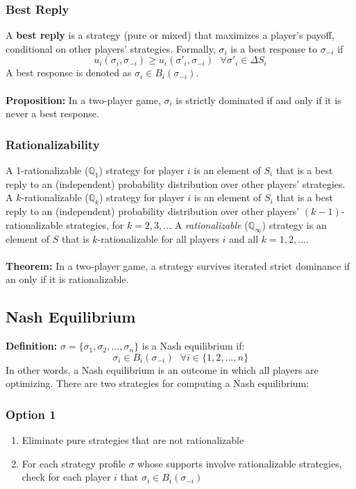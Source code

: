 \documentclass{article}
\newcommand{\Q}{\mathbb{Q}}
\begin{document}
\subsubsection{Best Reply}
A \textbf{best reply} is a strategy (pure or mixed) that maximizes a player's payoff, conditional on other players' strategies. Formally, $\sigma_i$ is a best response to $\sigma_{-i}$ if 
\[
	u_i(\sigma_i,\sigma_{-i})\geq u_i(\sigma'_i,\sigma_{-i})\text{ }\forall \sigma'_i\in\Delta S_i
\]
A best response is denoted as ${\sigma_i\in B_i(\sigma_{-i})}$. \\
\\
\textbf{Proposition:} In a two-player game, $\sigma_i$ is strictly dominated if and only if it is never a best response.

\subsubsection{Rationalizability}
A 1-rationalizable ($\Q_1$) strategy for player $i$ is an element of $S_i$ that is a best reply to an (independent) probability distribution over other players' strategies. A $k$-rationalizable ($\Q_k$) strategy for player $i$ is an element of $S_i$ that is a best reply to an (independent) probability distribution over other players' ${(k - 1)}$-rationalizable strategies, for ${k =2, 3,...}$  A \textit{rationalizable} ($\Q_\infty$) strategy is an element of $S$ that is $k$-rationalizable for all players $i$ and all ${k = 1, 2,...}$. \\
\\
\textbf{Theorem:} In a two-player game, a strategy survives iterated strict dominance if an only if it is rationalizable.

\subsection{Nash Equilibrium}
\textbf{Definition:} ${\sigma = \{\sigma_1,\sigma_2,...,\sigma_n\}}$ is a Nash equilibrium if:
\[
	\sigma_i\in B_i(\sigma_{-i})\text{ }\forall i\in\{1,2,...,n\}
\]
In other words, a Nash equilibrium is an outcome in which all players are optimizing. There are two strategies for computing a Nash equilibrium:
\subsubsection*{Option 1}
\begin{enumerate}
	\item Eliminate pure strategies that are not rationalizable 
	\item For each strategy profile $\sigma$ whose supports involve rationalizable strategies, check for each player $i$ that ${\sigma_i\in B_i(\sigma_{-i})}$
\end{enumerate}
\end{document}
